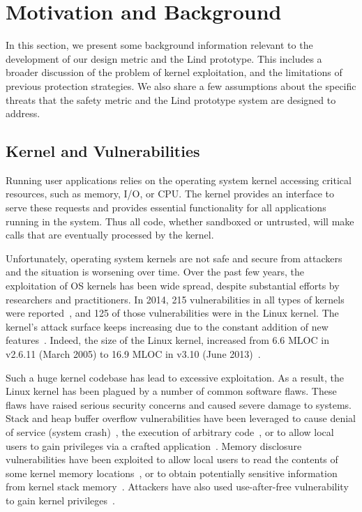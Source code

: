 \section{Motivation and Background}
\label{sec.motivation-and-background}

In this section, we present some background information 
relevant to the development of our design metric and the Lind prototype. 
This includes a broader discussion of the problem of kernel exploitation, 
and the limitations of previous protection strategies. 
We also share a few assumptions about the specific threats 
that the safety metric and the Lind prototype system are designed to
address.

\subsection{Kernel and Vulnerabilities}

Running user applications relies on the operating system kernel 
accessing critical resources, such as memory, I/O, or CPU. 
The kernel provides an interface to serve these requests 
and provides essential functionality for all applications running in the
system. 
Thus all code, whether sandboxed or untrusted, will make calls 
that are eventually processed by the kernel. 

Unfortunately, operating system kernels are not safe and secure from
attackers and the situation is worsening over time. 
Over the past few years, the exploitation of OS kernels has been wide
spread, 
despite substantial efforts by researchers and practitioners. 
In 2014, 215 vulnerabilities in all types of kernels were reported~\cite{NVD}, 
and 125 of those vulnerabilities were in the Linux kernel. 
The kernel's
attack surface keeps increasing due to the constant addition of new
features~\cite{Metrics-13}. 
Indeed, the size of the Linux kernel, increased from 6.6 MLOC in v2.6.11 
(March 2005) to 16.9 MLOC in v3.10 (June 2013)~\cite{Linux-13}. 


Such a huge kernel codebase has lead to excessive exploitation. 
As a result, the Linux kernel has been plagued by a number of common
software flaws. 
These flaws have raised serious security concerns and caused severe damage
to systems. 
Stack and heap buffer overflow vulnerabilities have been leveraged to 
cause denial of service (system crash)~\cite{CVE-2013-2892}, 
the execution of arbitrary code~\cite{CVE-2009-3234}, 
or to allow local users to gain privileges via a crafted 
application~\cite{CVE-2013-1828}. 
Memory disclosure vulnerabilities have been exploited to allow local users
to read 
the contents of some kernel memory locations~\cite{CVE-2009-3002}, or to
obtain potentially 
sensitive information from kernel stack memory~\cite{CVE-2010-4073}. 
Attackers have also used use-after-free vulnerability to gain kernel
privileges~\cite{CVE-2013-4343}.

